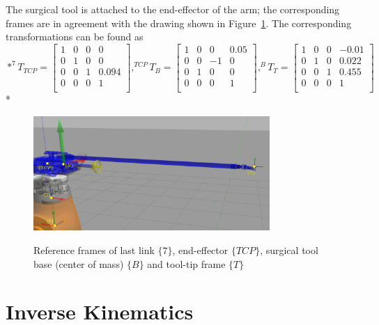 The surgical tool is attached to the end-effector of the arm; the corresponding frames are in agreement with the drawing shown in Figure~\ref{fig:kuka-surgical tool}. 
The corresponding transformations can be found as
\begin{equation}{*}
^{7}T_{TCP} = 
\begin{bmatrix}
1 & 0 & 0 & 0 \\
0 & 1 & 0 & 0 \\
0 & 0 & 1 & 0.094 \\
0 & 0 & 0 & 1 \\
\end{bmatrix}
,
^{TCP}T_{B} = 
\begin{bmatrix}
1 & 0 & 0 & 0.05 \\
0 & 0 & -1 & 0 \\
0 & 1 & 0 & 0 \\
0 & 0 & 0 & 1 \\
\end{bmatrix}
,
^{B}T_T = 
\begin{bmatrix}
1 & 0 & 0 & -0.01 \\
0 & 1 & 0 & 0.022 \\
0 & 0 & 1 & 0.455 \\
0 & 0 & 0 & 1 \\
\end{bmatrix}
\end{equation}{*}

\begin{figure}[htbp]
\centering
\includegraphics[width=0.8\textwidth]{images/eef_tcp_tip_tf.png}\\
\caption{Reference frames of last link $\lbrace 7 \rbrace$, end-effector $\lbrace TCP \rbrace$, surgical tool base (center of mass) $\lbrace B \rbrace$ and tool-tip frame $\lbrace T \rbrace$}
\label{fig:kuka-surgical tool}
\end{figure}

\section{Inverse Kinematics}

